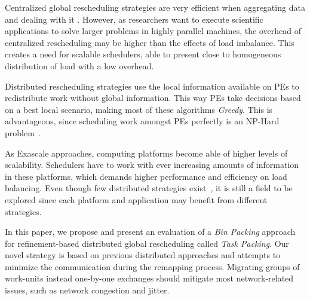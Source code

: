 Centralized global rescheduling strategies are very efficient when aggregating data and dealing with it . %
However, as researchers want to execute scientific applications to solve larger problems in highly parallel machines, the overhead of centralized rescheduling may be higher than the effects of load imbalance.
This creates a need for scalable schedulers, able to present close to homogeneous distribution of load with a low overhead.

Distributed rescheduling strategies use the local information available on PEs to redistribute work without global information.
This way PEs take decisions based on a best local scenario, making most of these algorithms \textit{Greedy}.
This is advantageous, since scheduling work amongst PEs perfectly is an NP-Hard problem~\cite{npcomplete}.

As Exascale approaches, computing platforms become able of higher levels of scalability.
Schedulers have to work with ever increasing amounts of information in these platforms, which demands higher performance and efficiency on load balancing.
Even though few distributed strategies exist~\cite{grapevine,diffus}, it is still a field to be explored since each platform and application may benefit from different strategies.

In this paper, we propose and present an evaluation of a \textit{Bin Packing} approach for refinement-based distributed global rescheduling called \textit{Task Packing}.
Our novel strategy is based on previous distributed approaches and attempts to minimize the communication during the remapping process.
Migrating groups of work-units instead one-by-one exchanges should mitigate most network-related issues, such as network congestion and jitter.

